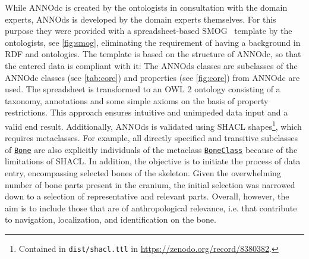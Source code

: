 \documentclass[sw]{iosart2x}
\newcommand{\anno}[1]{\href{https://annosaxfdm.de/ontology/#1}{\texttt{#1}}}
\begin{document}
While ANNOdc is created by the ontologists in consultation with the domain experts, ANNOds is developed by the domain experts themselves.
For this purpose they were provided with a spreadsheet-based SMOG~\citep{smog} template by the ontologists, see \cref{fig:smog}, eliminating the requirement of having a background in RDF and ontologies.
The template is based on the structure of ANNOdc, so that the entered data is compliant with it: The ANNOds classes are subclasses of the ANNOdc classes (see \cref{tab:core}) and properties (see \cref{fig:core}) from ANNOdc are used.
The spreadsheet is transformed to an OWL 2 ontology consisting of a taxonomy, annotations and some simple axioms on the basis of property restrictions.
This approach ensures intuitive and unimpeded data input and a valid end result.
Additionally, ANNOds is validated using SHACL shapes\footnote{Contained in \texttt{dist/shacl.ttl} in \url{https://zenodo.org/record/8380382}.}, which requires metaclasses.
For example, all directly specified and transitive subclasses of \anno{Bone} are also explicitly individuals of the metaclass \anno{BoneClass} because of the limitations of SHACL.
In addition, the objective is to initiate the process of data entry, encompassing selected bones of the skeleton.
%
%
Given the overwhelming number of bone parts present in the cranium, the initial selection was narrowed down to a selection of representative and relevant parts.
Overall, however, the aim is to include those that are of anthropological relevance, i.e. that contribute to navigation, localization, and identification on the bone.
\end{document}
